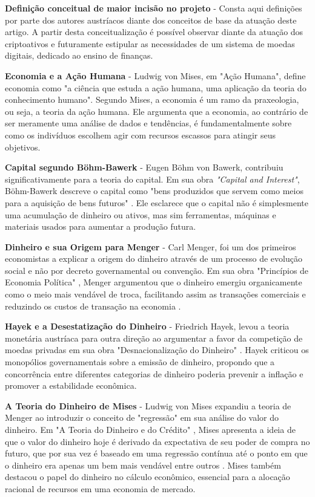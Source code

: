 \documentclass[article,12pt,oneside,a4paper,english,brazil]{unifil}
\begin{document}
\begin{Spacing}{1.5}
\textbf{Definição conceitual de maior incisão no projeto} -
Consta aqui definições por parte dos autores austríacos diante dos conceitos de base da atuação deste artigo. A partir desta conceitualização é possível observar diante da atuação dos criptoativos e futuramente estipular as necessidades de um sistema de moedas digitais, dedicado ao ensino de finanças.

\textbf{Economia e a Ação Humana} - Ludwig von Mises, em "Ação Humana"\cite{mises1949human}, define economia como "a ciência que estuda a ação humana, uma aplicação da teoria do conhecimento humano". Segundo Mises, a economia é um ramo da praxeologia, ou seja, a teoria da ação humana. Ele argumenta que a economia, ao contrário de ser meramente uma análise de dados e tendências, é fundamentalmente sobre como os indivíduos escolhem agir com recursos escassos para atingir seus objetivos.

\textbf{Capital segundo Böhm-Bawerk} - Eugen Böhm von Bawerk, contribuiu significativamente para a teoria do capital. Em sua obra \textit{"Capital and Interest"}\cite{bohm1884capital}, Böhm-Bawerk descreve o capital como "bens produzidos que servem como meios para a aquisição de bens futuros" \cite{bohm1884capital}. Ele esclarece que o capital não é simplesmente uma acumulação de dinheiro ou ativos, mas sim ferramentas, máquinas e materiais usados para aumentar a produção futura.

\textbf{Dinheiro e sua Origem para Menger} - Carl Menger, foi um dos primeiros economistas a explicar a origem do dinheiro através de um processo de evolução social e não por decreto governamental ou convenção. Em sua obra "Princípios de Economia Política" \cite{menger2017liberalismo}, Menger argumentou que o dinheiro emergiu organicamente como o meio mais vendável de troca, facilitando assim as transações comerciais e reduzindo os custos de transação na economia \cite{menger1871principles}.

\textbf{Hayek e a Desestatização do Dinheiro} - Friedrich Hayek, levou a teoria monetária austríaca para outra direção ao argumentar a favor da competição de moedas privadas em sua obra "Desnacionalização do Dinheiro" \cite{hayek2017desestatizaccao}. Hayek criticou os monopólios governamentais sobre a emissão de dinheiro, propondo que a concorrência entre diferentes categorias de dinheiro poderia prevenir a inflação e promover a estabilidade econômica.

\textbf{A Teoria do Dinheiro de Mises} - Ludwig von Mises expandiu a teoria de Menger ao introduzir o conceito de "regressão" em sua análise do valor do dinheiro. Em "A Teoria do Dinheiro e do Crédito" \cite{von2013theory}, Mises apresenta a ideia de que o valor do dinheiro hoje é derivado da expectativa de seu poder de compra no futuro, que por sua vez é baseado em uma regressão contínua até o ponto em que o dinheiro era apenas um bem mais vendável entre outros \cite{von2013theory}. Mises também destacou o papel do dinheiro no cálculo econômico, essencial para a alocação racional de recursos em uma economia de mercado.


\end{Spacing}
\end{document}
